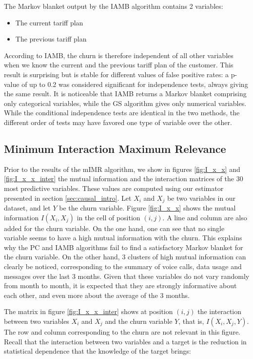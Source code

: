 The Markov blanket output by the IAMB algorithm contains 2 variables:
\noprelistbreak
\begin{itemize}
    \item The current tariff plan
    \item The previous tariff plan
\end{itemize}

According to IAMB, the churn is therefore independent of all other variables
when we know the current and the previous tariff plan of the customer. This
result is surprising but is stable for different values of false
positive rates: a p-value of up to 0.2 was considered significant for
independence tests, always giving the same result. It is noticeable that IAMB
returns a Markov blanket comprising only categorical variables, while the GS
algorithm gives only numerical variables. While the conditional independence
tests are identical in the two methods, the different order of tests may have
favored one type of variable over the other.

\subsection{Minimum Interaction Maximum Relevance}

Prior to the results of the mIMR algorithm, we show in figures \ref{fig:I_x_x}
and \ref{fig:I_x_x_inter} the mutual information and the interaction matrices of
the 30 most predictive variables. These values are computed using our estimator
presented in section \ref{sec:causal_intro}. Let $X_i$ and $X_j$ be two
variables in our dataset, and let $Y$ be the churn variable. Figure
\ref{fig:I_x_x} shows the mutual information $I(X_i, X_j)$ in the cell of
position $(i, j)$. A line and column are also added for the churn variable. On
the one hand, one can see that no single variable seems to have a high mutual
information with the churn. This explains why the PC and IAMB algorithms fail to
find a satisfactory Markov blanket for the churn variable. On the other hand, 3
clusters of high mutual information can clearly be noticed, corresponding to the
summary of voice calls, data usage and messages over the last 3 months. Given
that these variables do not vary randomly from month to month, it is expected
that they are strongly informative about each other, and even more about the
average of the 3 months.

The matrix in figure \ref{fig:I_x_x_inter} shows at position $(i, j)$ the
interaction between two variables $X_i$ and $X_j$ and the churn variable $Y$,
that is, $I(X_i, X_j, Y)$. The row and column corresponding to the churn are not
relevant in this figure. Recall that the interaction between two variables and a
target is the reduction in statistical dependence that the knowledge of the
target brings:


